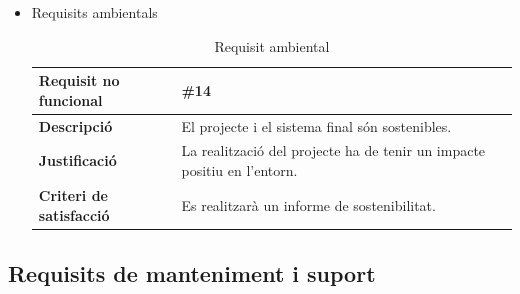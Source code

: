 \begin{itemize}
\item{Requisits ambientals}

\begin{table}[!h]
\begin{tabular}{|l|M|}
\hline
\textbf{Requisit no funcional }& \#14   \\ \hline
\textbf{Descripció} & El projecte i el sistema final són sostenibles. \\ \hline
\textbf{Justificació} & La realització del projecte ha de tenir un impacte positiu en l’entorn. \\ \hline
\textbf{Criteri de satisfacció} & Es realitzarà un informe de sostenibilitat.\\ \hline
\end{tabular}
\label{}
\caption{Requisit ambiental}
\end{table}

\end{itemize}

\clearpage

\subsection{Requisits de manteniment i suport}

